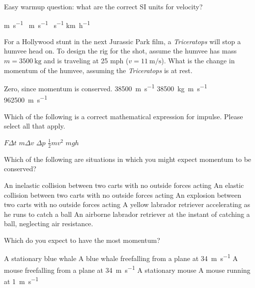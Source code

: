 \documentclass[exam,addpoints, noanswers]{exam}
\begin{document}
\begin{questions}
\question[5] Easy warmup question: what are the correct SI units for velocity? 
\begin{choices}
\CorrectChoice \si{\meter\per\second}
\choice \si{\per\meter\per\second}
\choice \si{\foot\per\second}
\choice \si{\kilo\meter\per\hour}
\end{choices}

\question[5] For a Hollywood stunt in the next Jurassic Park film, a \emph{\dag Triceratops} will stop a humvee head on. To design the rig for the shot, assume the humvee has mass $m=\SI{3500}{\kilo\gram}$ and is traveling at 25 mph ($v=\SI{11}{\meter\per\second}$). What is the change in momentum of the humvee, assuming the \emph{\dag Triceratops} is at rest. 
\begin{choices}
\choice Zero, since momentum is conserved. 
\choice \SI{38500}{\meter\per\second}
\CorrectChoice \SI{38500}{\kilo\gram\meter\per\second}
\choice \SI{962500}{\meter\per\second}
\end{choices}

\question[5] Which of the following is a correct mathematical expression for impulse. Please select all that apply. 
\begin{choices}
\CorrectChoice $F \Delta t$
\CorrectChoice $m \Delta v$
\CorrectChoice $\Delta p$
\choice $\frac{1}{2} m v^2$
\choice $m g h$
\end{choices}

\question[5] Which of the following are situations in which you might expect momentum to be conserved?
\begin{choices}
\CorrectChoice An inelastic collision between two carts with no outside forces acting
\CorrectChoice An elastic collision between two carts with no outside forces acting
\CorrectChoice An explosion between two carts with no outside forces acting
\choice A yellow labrador retriever accelerating as he runs to catch a ball
\CorrectChoice An airborne labrador retriever at the instant of catching a ball, neglecting air resistance. 
\end{choices}

\clearpage
\question[5] Which do you expect to have the most momentum?
\begin{choices}
\choice A stationary blue whale
\CorrectChoice A blue whale freefalling from a plane at \SI{34}{\meter\per\second}
\choice A mouse freefalling from a plane at \SI{34}{\meter\per\second}
\choice A stationary mouse
\choice A mouse running at \SI{1}{\meter\per\second}
\end{choices}


\end{questions}
\end{document}
